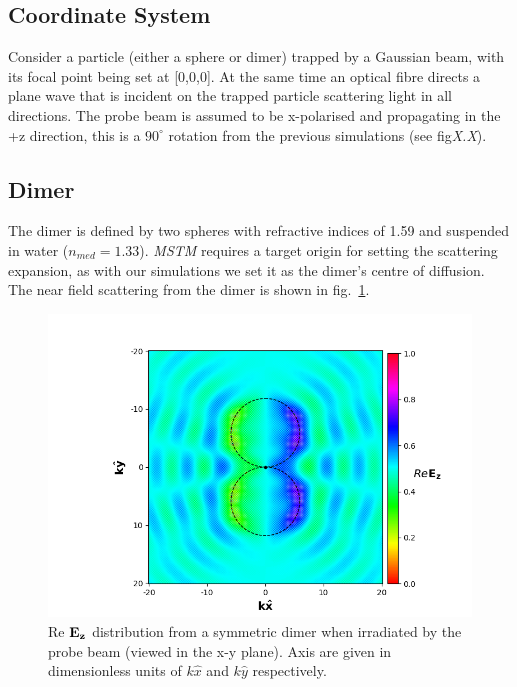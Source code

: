 \subsection{Coordinate System}
Consider a particle (either a sphere or dimer) trapped by
a Gaussian beam, with its focal point being set at [0,0,0]. 
At the same time an optical fibre directs a plane wave that 
is incident on the trapped particle scattering light in all 
directions. The probe beam is assumed to be x-polarised and 
propagating in the +z direction, this is a $90^{\circ}$ 
rotation from the previous simulations (see fig\emph{X.X}). 

\subsection{Dimer}
The dimer is defined by two spheres with refractive indices
of 1.59 and suspended in water ($n_{med} = 1.33$). \textit{MSTM}
requires a target origin for setting the scattering expansion, as
with our simulations we set it as the dimer's centre of diffusion.
The near field scattering from the dimer is shown in 
fig.~\ref{fig:nf_scattering}.

\begin{figure}[h!]
	\centering
	\includegraphics[width=\linewidth]{nf_scattering_dimer.png}
	\caption{Re ${\bf E_z}$ distribution from a symmetric dimer when 
	irradiated by the probe beam (viewed in the x-y plane). Axis are 
	given in dimensionless units of $k\hat{x}$ and $k\hat{y}$ respectively.}
	\label{fig:nf_scattering}
\end{figure}

